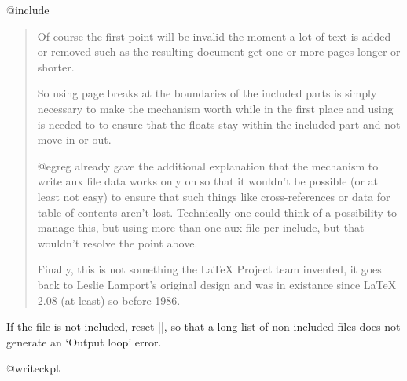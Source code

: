 \begin{multicols}
\begin{docCmd}{@include}{}
\begin{quotation}
Of course the first point will be invalid the moment a lot of text is added or removed such as the resulting document get one or more pages longer or shorter.

So using page breaks at the boundaries of the included parts is simply necessary to make the mechanism worth while in the first place and using  is needed to to ensure that the floats stay within the included part and not move in or out.

@egreg already gave the additional explanation that the mechanism to write aux file data works only on  so that it wouldn't be possible (or at least not easy) to ensure that such things like cross-references or data for table of contents aren't lost. Technically one could think of a possibility to manage this, but using more than one aux file per include, but that wouldn't resolve the point above.

Finally, this is not something the LaTeX Project team invented, it goes back to Leslie Lamport's original design and was in existance since LaTeX 2.08 (at least) so before 1986.
\end{quotation} 
 \end{docCmd}
    \begin{teX}
\def\@include#1 {%
  \clearpage
  \if@filesw
    \immediate\write\@mainaux{\string\@input{#1.aux}}%
  \fi
  \@tempswatrue
  \if@partsw
    \@tempswafalse
    \edef\reserved@b{#1}%
    \@for\reserved@a:=\@partlist\do
      {\ifx\reserved@a\reserved@b\@tempswatrue\fi}%
  \fi
  \if@tempswa
    \let\@auxout\@partaux
    \if@filesw
      \immediate\openout\@partaux #1.aux
      \immediate\write\@partaux{\relax}%
    \fi
    \@input@{#1.tex}%
    \clearpage
    \@writeckpt{#1}%
    \if@filesw
      \immediate\closeout\@partaux
    \fi
  \else
     \end{teX}
 If the file is not included, reset |\deadcycles|, so that a long
 list of non-included files does not generate an `Output loop'
 error.

    \begin{teX}
    \deadcycles\z@
  \fi
  \let\@auxout\@mainaux}
    \end{teX}



 \begin{docCmd}{@writeckpt}{}
 \end{docCmd}
    \begin{teX}
\def\@writeckpt#1{%
  \if@filesw
    \immediate\write\@partaux{\string\@setckpt{#1}\@charlb}%
    {\let\@elt\@wckptelt \cl@@ckpt}%
    \immediate\write\@partaux{\@charrb}%
  \fi}
    \end{teX}



\end{multicols}
